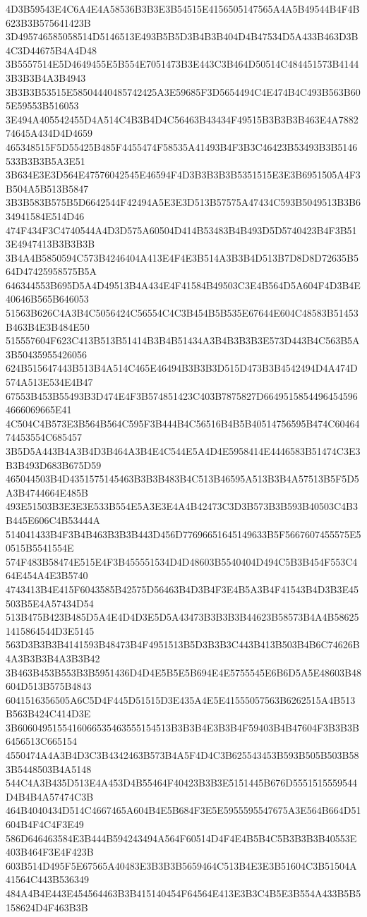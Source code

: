 {{{{{{{{{{{{{{{{{{{{{4D3B59543E4C6A4E4A58536B3B3E3B54515E4156505147565A4A5B49544B4F4B623B3B575641423B
3D495746585058514D5146513E493B5B5D3B4B3B404D4B47534D5A433B463D3B4C3D44675B4A4D48
3B5557514E5D4649455E5B554E7051473B3E443C3B464D50514C484451573B41443B3B3B4A3B4943
3B3B3B53515E58504440485742425A3E59685F3D5654494C4E474B4C493B563B605E59553B516053
3E494A405542455D4A514C4B3B4D4C56463B43434F49515B3B3B3B463E4A788274645A434D4D4659
465348515F5D55425B485F4455474F58535A41493B4F3B3C46423B53493B3B5146533B3B3B5A3E51
3B634E3E3D564E47576042545E46594F4D3B3B3B3B5351515E3E3B6951505A4F3B504A5B513B5847
3B3B583B575B5D6642544F42494A5E3E3D513B57575A47434C593B5049513B3B634941584E514D46
474F434F3C4740544A4D3D575A60504D414B53483B4B493D5D5740423B4F3B513E4947413B3B3B3B
3B4A4B5850594C573B4246404A413E4F4E3B514A3B3B4D513B7D8D8D72635B564D47425958575B5A
646344553B695D5A4D49513B4A434E4F41584B49503C3E4B564D5A604F4D3B4E40646B565B646053
51563B626C4A3B4C5056424C56554C4C3B454B5B535E67644E604C48583B51453B463B4E3B484E50
515557604F623C413B513B51414B3B4B51434A3B4B3B3B3E573D443B4C563B5A3B50435955426056
624B515647443B513B4A514C465E46494B3B3B3D515D473B3B4542494D4A474D574A513E534E4B47
67553B453B55493B3D474E4F3B574851423C403B7875827D66495158544964545964666069665E41
4C504C4B573E3B564B564C595F3B444B4C56516B4B5B40514756595B474C6046474453554C685457
3B5D5A443B4A3B4D3B464A3B4E4C544E5A4D4E5958414E4446583B51474C3E3B3B493D683B675D59
465044503B4D4351575145463B3B3B483B4C513B46595A513B3B4A57513B5F5D5A3B4744664E485B
493E51503B3E3E3E533B554E5A3E3E4A4B42473C3D3B573B3B593B40503C4B3B445E606C4B53444A
514041433B4F3B4B463B3B3B443D456D77696651645149633B5F5667607455575E50515B5541554E
574F483B58474E515E4F3B455551534D4D48603B5540404D494C5B3B454F553C464E454A4E3B5740
4743413B4E415F6043585B42575D56463B4D3B4F3E4B5A3B4F41543B4D3B3E45503B5E4A57434D54
513B475B423B485D5A4E4D4D3E5D5A43473B3B3B3B44623B58573B4A4B586251415864544D3E5145
563D3B3B3B4141593B48473B4F4951513B5D3B3B3C443B413B503B4B6C74626B4A3B3B3B4A3B3B42
3B463B453B553B3B5951436D4D4E5B5E5B694E4E5755545E6B6D5A5E48603B48604D513B575B4843
6041516356505A6C5D4F445D51515D3E435A4E5E41555057563B6262515A4B513B563B424C414D3E
3B6060495155416066535463555154513B3B3B4E3B3B4F59403B4B47604F3B3B3B6456513C665154
4550474A4A3B4D3C3B4342463B573B4A5F4D4C3B625543453B593B505B503B583B5448503B4A5148
544C4A3B435D513E4A453D4B55464F40423B3B3E5151445B676D5551515559544D4B4B4A57474C3B
464B4040434D514C4667465A604B4E5B684F3E5E5955595547675A3E564B664D51604B4F4C4F3E49
586D646463584E3B444B594243494A564F60514D4F4E4B5B4C5B3B3B3B40553E403B464F3E4F423B
603B514D495F5E67565A40483E3B3B3B5659464C513B4E3E3B51604C3B51504A41564C443B536349
484A4B4E443E454564463B3B415140454F64564E413E3B3C4B5E3B554A433B5B5158624D4F463B3B
}}}}}}}}}}}}}}}}}}}}}
